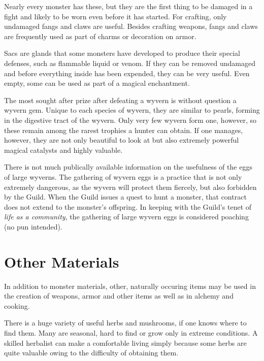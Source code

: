 Nearly every monster has these, but they are the first thing to be damaged in a fight and likely to be worn even before it has started. For crafting, only undamaged fangs and claws are useful. Besides crafting weapons, fangs and claws are frequently used as part of charms or decoration on armor.

Sacs are glands that some monsters have developed to produce their special defenses, such as flammable liquid or venom. If they can be removed undamaged and before everything inside has been expended, they can be very useful. Even empty, some can be used as part of a magical enchantment.

The most sought after prize after defeating a wyvern is without question a wyvern gem. Unique to each species of wyvern, they are similar to pearls, forming in the digestive tract of the wyvern. Only very few wyvern form one, however, so these remain among the rarest trophies a hunter can obtain. If one manages, however, they are not only beautiful to look at but also extremely powerful magical catalysts and highly valuable.

There is not much publically available information on the usefulness of the eggs of large wyverns. The gathering of wyvern eggs is a practice that is not only extremely dangerous, as the wyvern will protect them fiercely, but also forbidden by the Guild. When the Guild issues a quest to hunt a monster, that contract does not extend to the monster's offspring. In keeping with the Guild's tenet of \emph{life as a community}, the gathering of large wyvern eggs is considered poaching (no pun intended).


\section{Other Materials}
In addition to monster materials, other, naturally occuring items may be used in the creation of weapons, armor and other items as well as in alchemy and cooking.

There is a huge variety of useful herbs and mushrooms, if one knows where to find them. Many are seasonal, hard to find or grow only in extreme conditions. A skilled herbalist can make a comfortable living simply because some herbs are quite valuable owing to the difficulty of obtaining them.

